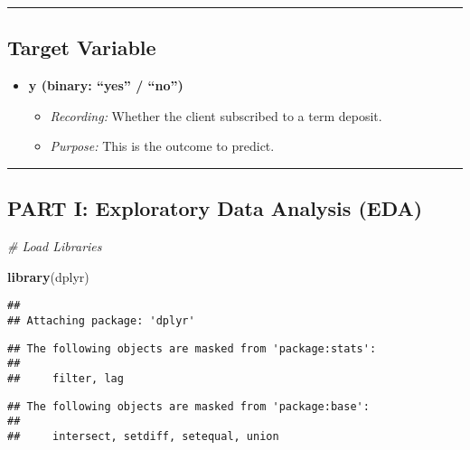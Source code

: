\documentclass[
]{article}
\newenvironment{Shaded}{\begin{snugshade}}{\end{snugshade}}
\newcommand{\CommentTok}[1]{\textcolor[rgb]{0.56,0.35,0.01}{\textit{#1}}}
\newcommand{\FunctionTok}[1]{\textcolor[rgb]{0.13,0.29,0.53}{\textbf{#1}}}
\newcommand{\NormalTok}[1]{#1}
\providecommand{\tightlist}{%
  \setlength{\itemsep}{0pt}\setlength{\parskip}{0pt}}
\begin{document}
\begin{center}\rule{0.5\linewidth}{0.5pt}\end{center}

\subsection{Target Variable}\label{target-variable}

\begin{itemize}
\tightlist
\item
  \textbf{y (binary: ``yes'' / ``no'')}

  \begin{itemize}
  \tightlist
  \item
    \emph{Recording:} Whether the client subscribed to a term deposit.\\
  \item
    \emph{Purpose:} This is the outcome to predict.
  \end{itemize}
\end{itemize}

\begin{center}\rule{0.5\linewidth}{0.5pt}\end{center}

\subsection{PART I: Exploratory Data Analysis
(EDA)}\label{part-i-exploratory-data-analysis-eda}

\begin{Shaded}
\begin{Highlighting}[]
\CommentTok{\# Load Libraries}

\FunctionTok{library}\NormalTok{(dplyr)}
\end{Highlighting}
\end{Shaded}

\begin{verbatim}
## 
## Attaching package: 'dplyr'
\end{verbatim}

\begin{verbatim}
## The following objects are masked from 'package:stats':
## 
##     filter, lag
\end{verbatim}

\begin{verbatim}
## The following objects are masked from 'package:base':
## 
##     intersect, setdiff, setequal, union
\end{verbatim}
\end{document}
